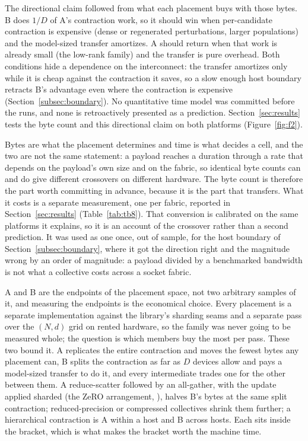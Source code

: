 The directional claim followed from what each placement buys with those
bytes. B does $1/D$ of A's contraction work, so it should win when
per-candidate contraction is expensive (dense or regenerated perturbations,
larger populations) and the model-sized transfer amortizes. A should return
when that work is already small (the low-rank family) and the transfer is
pure overhead. Both conditions hide a dependence on the interconnect: the
transfer amortizes only while it is cheap against the contraction it saves,
so a slow enough host boundary retracts B's advantage even where the
contraction is expensive (Section~\ref{subsec:boundary}). No quantitative
time model was committed before the runs, and
none is retroactively presented as a prediction. Section~\ref{sec:results}
tests the byte count and this directional claim on both platforms
(Figure~\ref{fig:f2}).

Bytes are what the placement determines and time is what decides a cell, and
the two are not the same statement: a payload reaches a duration through a
rate that depends on the payload's own size and on the fabric, so identical
byte counts can and do give different crossovers on different hardware. The
byte count is therefore the part worth committing in advance, because it is
the part that transfers. What it costs is a separate measurement, one per
fabric, reported in Section~\ref{sec:results} (Table~\ref{tab:tb8}). That
conversion is calibrated on the same platforms it explains, so it is an
account of the crossover rather than a second prediction. It was used as one
once, out of sample, for the host boundary of Section~\ref{subsec:boundary},
where it got the direction right and the magnitude wrong by an order of
magnitude: a payload divided by a benchmarked bandwidth is not what a
collective costs across a socket fabric.

A and B are the endpoints of the placement space, not two arbitrary samples
of it, and measuring the endpoints is the economical choice. Every placement
is a separate implementation against the library's sharding seams and a
separate pass over the $(N,d)$ grid on rented hardware, so the family was
never going to be measured whole; the question is which members buy the most
per pass. These two bound it. A replicates the entire contraction and moves
the fewest bytes any placement can, B splits the contraction as far as $D$
devices allow and pays a model-sized transfer to do it, and every
intermediate trades one for the other between them. A reduce-scatter
followed by an all-gather, with the update applied sharded (the ZeRO
arrangement, \citealp{rajbhandari2020zero}), halves B's bytes at the same
split contraction; reduced-precision or compressed collectives shrink them
further; a hierarchical contraction is A within a host and B across hosts.
Each sits inside the bracket, which is what makes the bracket worth the
machine time.

